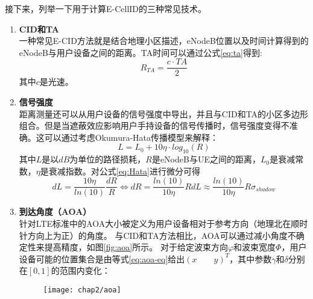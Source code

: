 接下来，列举一下用于计算E-CellID的三种常见技术。
\begin{enumerate}
    \item \textbf{CID和TA} \\一种常见E-CID方法就是结合地理小区描述，eNodeB位置以及时间计算得到的eNodeB与用户设备之间的距离。TA时间可以通过公式\ref{eq:ta}得到:
    {\setlength\abovedisplayskip{15pt}
    \setlength\belowdisplayskip{15pt}
        \begin{equation}
            \label{eq:ta}
            R_{TA}=\frac{c\cdot TA}{2}
        \end{equation}}
        其中$c$是光速。
    \item \textbf{信号强度} \\ 距离测量还可以从用户设备的信号强度中导出，并且与CID和TA的小区多边形组合。但是当遮蔽效应影响用户手持设备的信号传播时，信号强度变得不准确。这可以通过考虑Okumura-Hata传播模型来解释：
    {\setlength\abovedisplayskip{15pt}
    \setlength\belowdisplayskip{15pt}
        \begin{equation}
            \label{eq:Hata}
            L=L_{0}+10\eta\cdot log_{10}(R)
        \end{equation}}
        其中$L$是以$dB$为单位的路径损耗，$R$是eNodeB与UE之间的距离，$L_{0}$是衰减常数，$\eta$是衰减指数。对公式\ref{eq:Hata}进行微分可得
        {\setlength\abovedisplayskip{15pt}
        \setlength\belowdisplayskip{15pt}
         \begin{equation}
            \label{eq:Hata-diff}
            dL=\frac{10\eta}{ln(10)}\frac{dR}{R} \Leftrightarrow dR=\frac{ln(10)}{10\eta}RdL\approx\frac{ln(10)}{10\eta}R\sigma_{shadow}
        \end{equation}}      
    \item \textbf{到达角度（AOA）} \\ 针对LTE标准中的AOA大小被定义为用户设备相对于参考方向（地理北在顺时针方向上为正）的角度。 与CID和TA方法相比，AOA可以通过减小角度不确定性来提高精度，如图\ref{fig:aoa}所示。 对于给定波束方向$\varphi$和波束宽度$\Phi$，用户设备可能的位置集合是由等式\ref{eq:aoa-eq}给出$(x\qquad y)^T$，其中参数$\gamma$和$\delta$分别在$[0,1]$的范围内变化：
        \begin{figure}[!htp]
            \centering
            \texttt{[image: chap2/aoa]}
        \end{figure}
        {\setlength\abovedisplayskip{15pt}
        \setlength\belowdisplayskip{15pt}
        \begin{equation}

\end{equation}}
\end{enumerate}
